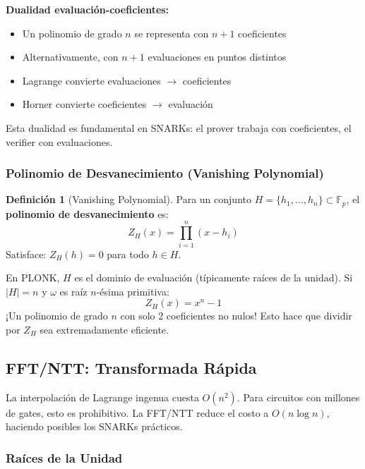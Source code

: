 \documentclass[11pt,a4paper,twoside,openright]{book}
\theoremstyle{definition}
\newtheorem{definition}{Definición}[chapter]
\theoremstyle{plain}
\theoremstyle{remark}
\begin{document}
\begin{keyidea}
\textbf{Dualidad evaluación-coeficientes:}
\begin{itemize}
    \item Un polinomio de grado $n$ se representa con $n+1$ coeficientes
    \item Alternativamente, con $n+1$ evaluaciones en puntos distintos
    \item Lagrange convierte evaluaciones $\to$ coeficientes
    \item Horner convierte coeficientes $\to$ evaluación
\end{itemize}
Esta dualidad es fundamental en SNARKs: el prover trabaja con coeficientes, el verifier con evaluaciones.
\end{keyidea}

\subsubsection{Polinomio de Desvanecimiento (Vanishing Polynomial)}

\begin{definition}[Vanishing Polynomial]
Para un conjunto $H = \{h_1, \ldots, h_n\} \subset \mathbb{F}_p$, el \textbf{polinomio de desvanecimiento} es:
\[ Z_H(x) = \prod_{i=1}^{n} (x - h_i) \]
Satisface: $Z_H(h) = 0$ para todo $h \in H$.
\end{definition}

\begin{bancozk}
En PLONK, $H$ es el dominio de evaluación (típicamente raíces de la unidad). Si $|H| = n$ y $\omega$ es raíz $n$-ésima primitiva:
\[ Z_H(x) = x^n - 1 \]
¡Un polinomio de grado $n$ con solo 2 coeficientes no nulos! Esto hace que dividir por $Z_H$ sea extremadamente eficiente.
\end{bancozk}

\subsection{FFT/NTT: Transformada Rápida}

\begin{intuicion}
La interpolación de Lagrange ingenua cuesta $O(n^2)$. Para circuitos con millones de gates, esto es prohibitivo. La FFT/NTT reduce el costo a $O(n \log n)$, haciendo posibles los SNARKs prácticos.
\end{intuicion}

\subsubsection{Raíces de la Unidad}
\end{document}
